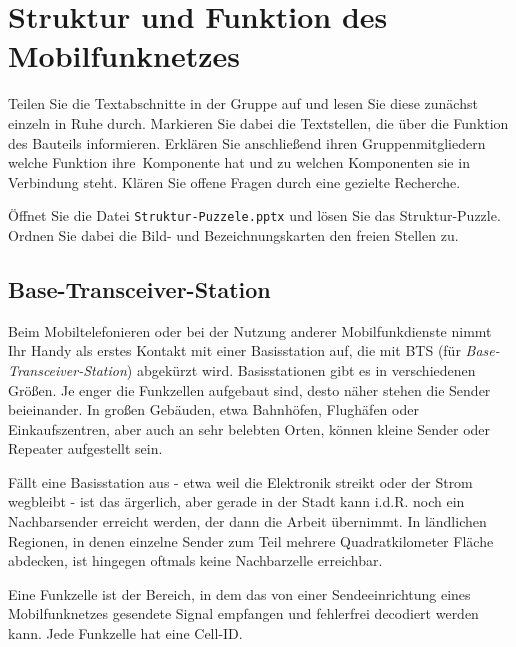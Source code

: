 \documentclass[loesung]{schulein}
\begin{document}
 
%
\section*{Struktur und Funktion des Mobilfunknetzes}
\begin{aufgaben}
\item Teilen Sie die Textabschnitte in der Gruppe auf und lesen Sie diese zunächst einzeln in Ruhe durch. Markieren Sie dabei die Textstellen, die über die Funktion des Bauteils informieren. Erklären Sie  anschließend ihren Gruppenmitgliedern welche Funktion \glqq ihre\grqq\ Komponente hat und zu welchen Komponenten sie in Verbindung steht. Klären Sie offene Fragen durch eine gezielte Recherche.
\item Öffnet Sie die Datei \texttt{Struktur-Puzzele.pptx} und lösen Sie das Struktur-Puzzle. Ordnen Sie dabei die Bild- und Bezeichnungskarten den freien Stellen zu. 

\end{aufgaben}
%
\subsection*{Base-Transceiver-Station}
Beim Mobiltelefonieren oder bei der Nutzung anderer Mobilfunkdienste nimmt Ihr Handy als erstes Kontakt mit einer Basisstation auf, die mit BTS (für \textit{Base-Transceiver-Station}) abgekürzt wird. %
Basisstationen gibt es in verschiedenen \glqq Größen\grqq . Je enger die Funkzellen aufgebaut sind, desto näher stehen die Sender beieinander. In großen Gebäuden, etwa Bahnhöfen, Flughäfen oder Einkaufszentren, aber auch an sehr belebten Orten, können kleine Sender oder Repeater aufgestellt sein.

Fällt eine Basisstation aus - etwa weil die Elektronik streikt oder der Strom wegbleibt - ist das ärgerlich, aber gerade in der Stadt kann i.d.R. noch ein Nachbarsender erreicht werden, der dann die Arbeit übernimmt. In ländlichen Regionen, in denen einzelne Sender zum Teil mehrere Quadratkilometer Fläche abdecken, ist hingegen oftmals keine Nachbarzelle erreichbar.
 
Eine Funkzelle ist der Bereich, in dem das von einer Sendeeinrichtung eines Mobilfunknetzes gesendete Signal empfangen und fehlerfrei decodiert werden kann. Jede Funkzelle hat eine Cell-ID.
\end{document}
